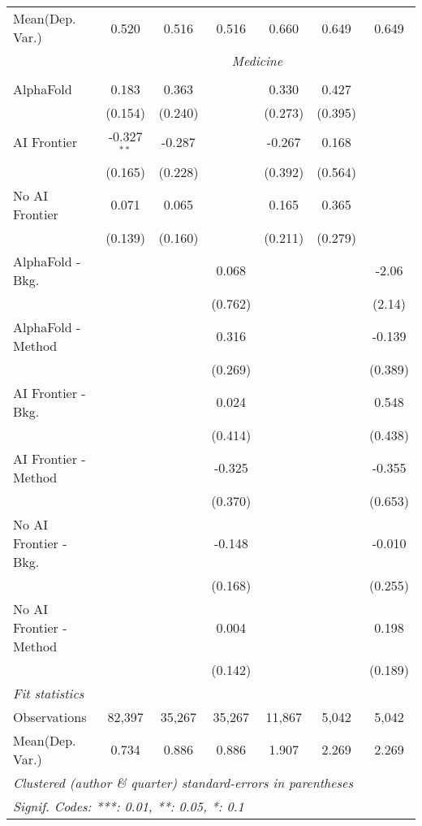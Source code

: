 \begin{tabular}{lcccccc}
Mean(Dep. Var.) & 0.520 & 0.516 & 0.516 & 0.660 & 0.649 & 0.649 \\
 & \multicolumn{6}{c}{\textit{Medicine}} \\ \\
   AlphaFold               & 0.183         & 0.363   &         & 0.330   & 0.427   &   \\   
                           & (0.154)       & (0.240) &         & (0.273) & (0.395) &   \\   
   AI Frontier             & -0.327$^{**}$ & -0.287  &         & -0.267  & 0.168   &   \\   
                           & (0.165)       & (0.228) &         & (0.392) & (0.564) &   \\   
   No AI Frontier          & 0.071         & 0.065   &         & 0.165   & 0.365   &   \\   
                           & (0.139)       & (0.160) &         & (0.211) & (0.279) &   \\   
   AlphaFold - Bkg.        &               &         & 0.068   &         &         & -2.06\\   
                           &               &         & (0.762) &         &         & (2.14)\\   
   AlphaFold - Method      &               &         & 0.316   &         &         & -0.139\\   
                           &               &         & (0.269) &         &         & (0.389)\\   
   AI Frontier - Bkg.      &               &         & 0.024   &         &         & 0.548\\   
                           &               &         & (0.414) &         &         & (0.438)\\   
   AI Frontier - Method    &               &         & -0.325  &         &         & -0.355\\   
                           &               &         & (0.370) &         &         & (0.653)\\   
   No AI Frontier - Bkg.   &               &         & -0.148  &         &         & -0.010\\   
                           &               &         & (0.168) &         &         & (0.255)\\   
   No AI Frontier - Method &               &         & 0.004   &         &         & 0.198\\   
                           &               &         & (0.142) &         &         & (0.189)\\   
   \midrule
   \emph{Fit statistics}\\
   Observations            & 82,397        & 35,267  & 35,267  & 11,867  & 5,042   & 5,042\\  
Mean(Dep. Var.) & 0.734 & 0.886 & 0.886 & 1.907 & 2.269 & 2.269 \\
   \midrule \midrule
   \multicolumn{7}{l}{\emph{Clustered (author \& quarter) standard-errors in parentheses}}\\
   \multicolumn{7}{l}{\emph{Signif. Codes: ***: 0.01, **: 0.05, *: 0.1}}\\
\end{tabular}
\par\endgroup
